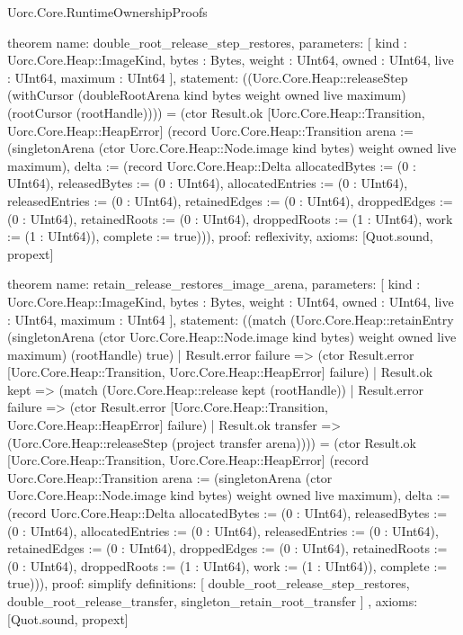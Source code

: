\begin{lexlean}{Uorc.Core.RuntimeOwnershipProofs}
\begin{semanticmodule}
theorem{
  name: double_root_release_step_restores,
  parameters: [
    kind : Uorc.Core.Heap::ImageKind,
    bytes : Bytes,
    weight : UInt64,
    owned : UInt64,
    live : UInt64,
    maximum : UInt64
  ],
  statement: ((Uorc.Core.Heap::releaseStep (withCursor (doubleRootArena kind bytes weight owned live maximum) (rootCursor (rootHandle)))) = (ctor Result.ok [Uorc.Core.Heap::Transition, Uorc.Core.Heap::HeapError] (record Uorc.Core.Heap::Transition {arena := (singletonArena (ctor Uorc.Core.Heap::Node.image kind bytes) weight owned live maximum), delta := (record Uorc.Core.Heap::Delta {allocatedBytes := (0 : UInt64), releasedBytes := (0 : UInt64), allocatedEntries := (0 : UInt64), releasedEntries := (0 : UInt64), retainedEdges := (0 : UInt64), droppedEdges := (0 : UInt64), retainedRoots := (0 : UInt64), droppedRoots := (1 : UInt64), work := (1 : UInt64)}), complete := true}))),
  proof: reflexivity{},
  axioms: [Quot.sound, propext]
}

theorem{
  name: retain_release_restores_image_arena,
  parameters: [
    kind : Uorc.Core.Heap::ImageKind,
    bytes : Bytes,
    weight : UInt64,
    owned : UInt64,
    live : UInt64,
    maximum : UInt64
  ],
  statement: ((match (Uorc.Core.Heap::retainEntry (singletonArena (ctor Uorc.Core.Heap::Node.image kind bytes) weight owned live maximum) (rootHandle) true)
    | Result.error failure => (ctor Result.error [Uorc.Core.Heap::Transition, Uorc.Core.Heap::HeapError] failure)
    | Result.ok kept => (match (Uorc.Core.Heap::release kept (rootHandle))
      | Result.error failure => (ctor Result.error [Uorc.Core.Heap::Transition, Uorc.Core.Heap::HeapError] failure)
      | Result.ok transfer => (Uorc.Core.Heap::releaseStep (project transfer arena)))) = (ctor Result.ok [Uorc.Core.Heap::Transition, Uorc.Core.Heap::HeapError] (record Uorc.Core.Heap::Transition {arena := (singletonArena (ctor Uorc.Core.Heap::Node.image kind bytes) weight owned live maximum), delta := (record Uorc.Core.Heap::Delta {allocatedBytes := (0 : UInt64), releasedBytes := (0 : UInt64), allocatedEntries := (0 : UInt64), releasedEntries := (0 : UInt64), retainedEdges := (0 : UInt64), droppedEdges := (0 : UInt64), retainedRoots := (0 : UInt64), droppedRoots := (1 : UInt64), work := (1 : UInt64)}), complete := true}))),
  proof: simplify{
    definitions: [
      double_root_release_step_restores,
      double_root_release_transfer,
      singleton_retain_root_transfer
    ]
  },
  axioms: [Quot.sound, propext]
}
\end{semanticmodule}

\end{lexlean}
